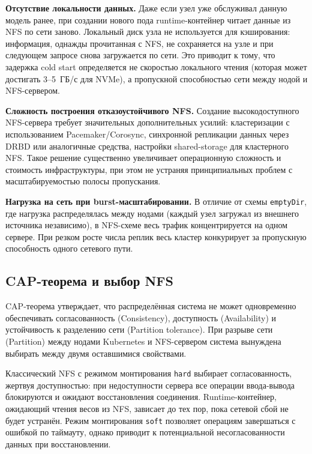 \textbf{Отсутствие локальности данных.} Даже если узел уже обслуживал данную модель ранее, при создании нового пода runtime-контейнер читает данные из NFS по сети заново. Локальный диск узла не используется для кэширования: информация, однажды прочитанная с NFS, не сохраняется на узле и при следующем запросе снова загружается по сети. Это приводит к тому, что задержка cold start определяется не скоростью локального чтения (которая может достигать 3--5~ГБ/с для NVMe), а пропускной способностью сети между нодой и NFS-сервером.

\textbf{Сложность построения отказоустойчивого NFS.} Создание высокодоступного NFS-сервера требует значительных дополнительных усилий: кластеризации с использованием Pacemaker/Corosync, синхронной репликации данных через DRBD или аналогичные средства, настройки shared-storage для кластерного NFS. Такое решение существенно увеличивает операционную сложность и стоимость инфраструктуры, при этом не устраняя принципиальных проблем с масштабируемостью полосы пропускания.

\textbf{Нагрузка на сеть при burst-масштабировании.} В отличие от схемы \texttt{emptyDir}, где нагрузка распределялась между нодами (каждый узел загружал из внешнего источника независимо), в NFS-схеме весь трафик концентрируется на одном сервере. При резком росте числа реплик весь кластер конкурирует за пропускную способность одного сетевого пути.

\subsection*{CAP-теорема и выбор NFS}

CAP-теорема \cite{brewer2000cap} утверждает, что распределённая система не может одновременно обеспечивать согласованность (Consistency), доступность (Availability) и устойчивость к разделению сети (Partition tolerance). При разрыве сети (Partition) между нодами Kubernetes и NFS-сервером система вынуждена выбирать между двумя оставшимися свойствами.

Классический NFS с режимом монтирования \texttt{hard} выбирает согласованность, жертвуя доступностью: при недоступности сервера все операции ввода-вывода блокируются и ожидают восстановления соединения. Runtime-контейнер, ожидающий чтения весов из NFS, зависает до тех пор, пока сетевой сбой не будет устранён. Режим монтирования \texttt{soft} позволяет операциям завершаться с ошибкой по таймауту, однако приводит к потенциальной несогласованности данных при восстановлении.

